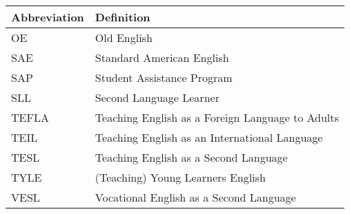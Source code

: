 \chapter*{}

\begin{table}[h!] 
\renewcommand\arraystretch{1.5} %
\begin{tabular}{p{5cm}p{10cm}}
\multicolumn{1}{l}{\textbf{Abbreviation}} & \multicolumn{1}{l}{\textbf{Definition}} \\ \hline 
OE & Old English \\ 
SAE & Standard American English \\ 
SAP & Student Assistance Program \\ 
SLL & Second Language Learner \\ 
TEFLA & Teaching English as a Foreign Language to Adults \\ 
TEIL & Teaching English as an International Language \\
 TESL & Teaching English as a Second Language \\ 
 TYLE & (Teaching) Young Learners English \\ 
 VESL & Vocational English as a Second Language \\ \hline
\end{tabular}
\caption*{} 
\label{tab:abb}
\end{table}